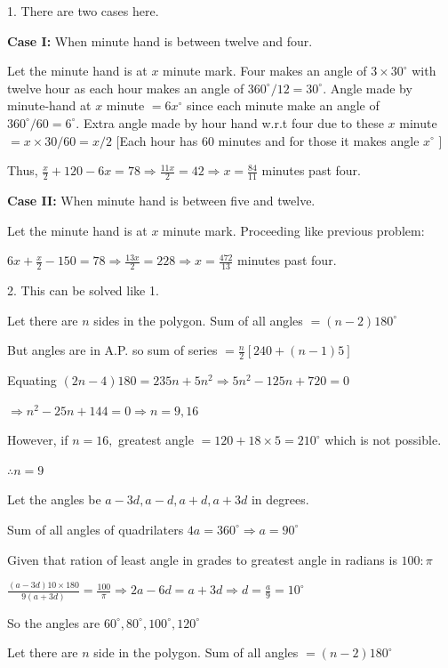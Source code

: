     1. There are two cases here.

       {\bf Case I:} When minute hand is between twelve and four.

       Let the minute hand is at $x$ minute mark. Four makes an angle of $3\times 30^\circ$ with twelve hour as each
       hour makes an angle of $360^\circ/12 = 30^\circ.$ Angle made by minute-hand at $x$ minute $=6x^\circ$
       since each minute make an angle of $360^\circ/60 = 6^\circ.$ Extra angle made by hour hand w.r.t four due to these
       $x$ minute $=x\times 30/60 = x/2$ [Each hour has $60$ minutes and for those it makes angle $x^\circ$
       ]

       Thus, $\frac{x}{2} + 120 - 6x = 78 \Rightarrow \frac{11x}{2} = 42 \Rightarrow x = \frac{84}{11}$ minutes past four.

       {\bf Case II:} When minute hand is between five and twelve.

       Let the minute hand is at $x$ minute mark. Proceeding like previous problem:

       $6x + \frac{x}{2} - 150 = 78 \Rightarrow \frac{13x}{2} = 228 \Rightarrow x = \frac{472}{13}$ minutes past four.

    2. This can be solved like 1.
\item Let there are $n$ sides in the polygon. Sum of all angles $= (n - 2)180^\circ$

    But angles are in A.P. so sum of series $= \frac{n}{2}[240 + (n - 1)5]$

    Equating $(2n - 4)180 = 235n + 5n^2 \Rightarrow 5n^2 - 125n + 720 = 0$

    $\Rightarrow n^2 - 25n + 144 = 0 \Rightarrow n = 9, 16$

    However, if $n = 16,$ greatest angle $= 120 + 18\times 5 = 210^\circ$ which is not possible.

    $\therefore n = 9$
\item Let the angles be $a - 3d, a - d, a + d, a + 3d$ in degrees.

    Sum of all angles of quadrilaters $4a = 360^\circ \Rightarrow a = 90^\circ$

    Given that ration of least angle in grades to greatest angle in radians is $100:\pi$

    $\frac{(a - 3d)10\times 180}{9(a + 3d)} = \frac{100}{\pi} \Rightarrow 2a - 6d = a + 3d \Rightarrow d = \frac{a}{9} = 10^\circ$

    So the angles are $60^\circ, 80^\circ, 100^\circ, 120^\circ$
\item Let there are $n$ side in the polygon. Sum of all angles $= (n - 2)180^\circ$

